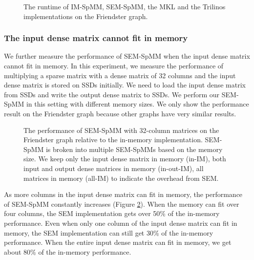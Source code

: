 
\begin{figure}
	\begin{center}
		\footnotesize
		
		\caption{The runtime of IM-SpMM, SEM-SpMM, the MKL and the Trilinos
			implementations on the Friendster graph.}
		\label{perf:spmm}
	\end{center}
\end{figure}

\subsubsection{The input dense matrix cannot fit in memory}

We further measure the performance of SEM-SpMM when the input dense matrix
cannot fit in memory. In this experiment, we
measure the performance of multiplying a sparse matrix with a dense matrix
of 32 columns and the input dense matrix is stored on SSDs initially.
We need to load the input dense matrix from SSDs and write the output dense
matrix to SSDs. We perform our SEM-SpMM in this setting with different memory
sizes. We only show the performance result on the Friendster graph because
other graphs have very similar results.

\begin{figure}
	\begin{center}
		\footnotesize
		
		\caption{The performance of SEM-SpMM with 32-column matrices on
			the Friendster graph relative to the in-memory implementation.
			SEM-SpMM is broken into multiple SEM-SpMMs based on the memory
			size. We keep only the input dense matrix in memory (in-IM),
			both input and output dense matrices in memory (in-out-IM),
			all matrices in memory (all-IM) to indicate the overhead from SEM.}
		\label{perf:spmm32}
	\end{center}
\end{figure}

As more columns in the input dense matrix can fit in memory, the performance
of SEM-SpMM constantly increases (Figure \ref{perf:spmm32}). When the memory
can fit over four columns, the SEM implementation gets over 50\% of
the in-memory performance. Even when only one column of the input dense matrix
can fit in memory, the SEM implementation can still get 30\% of the in-memory
performance. When the entire input dense matrix can fit in memory, we get about
80\% of the in-memory performance.

